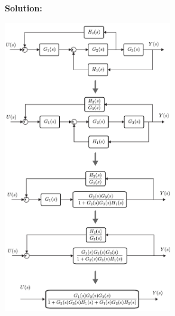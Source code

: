 \documentclass[twoside]{article}
\begin{document}
\textbf{Solution:} 
  
        \begin{minipage}[h]{0.95\linewidth}
    \begin{center}
      \includegraphics[width=0.55\textwidth]{ex1_sol}
    \end{center}
  \end{minipage}
  
\end{document}

